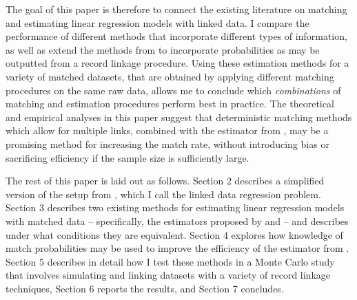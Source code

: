 \documentclass[12pt]{article}
\begin{document}
The goal of this paper is therefore to connect the existing literature on matching and estimating linear regression models with linked data.  I compare the performance of different methods that incorporate different types of information, as well as extend the methods from \citet*{ahl2019} to incorporate probabilities as may be outputted from a record linkage procedure.  Using these estimation methods for a variety of matched datasets, that are obtained by applying different matching procedures on the same raw data, allows me to conclude which \textit{combinations} of matching and estimation procedures perform best in practice.  The theoretical and empirical analyses in this paper suggest that deterministic matching methods which allow for multiple links, combined with the estimator from \citet*{ahl2019}, may be a promising method for increasing the match rate, without introducing bias or sacrificing efficiency if the sample size is sufficiently large.  

The rest of this paper is laid out as follows.  Section 2 describes a simplified version of the setup from \citet*{ahl2019}, which I call the linked data regression problem.  Section 3 describes two existing methods for estimating linear regression models with matched data -- specifically, the estimators proposed by \cite{sw1993} and \citet*{ahl2019} -- and describes under what conditions they are equivalent.  Section 4 explores how knowledge of match probabilities may be used to improve the efficiency of the estimator from \citet*{ahl2019}.   Section 5 describes in detail how I test these methods in a Monte Carlo study that involves simulating and linking datasets with a variety of record linkage techniques, Section 6 reports the results, and Section 7 concludes. 

\end{document}
